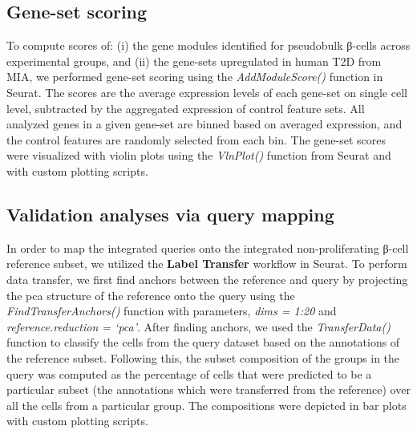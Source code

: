 \subsection{Gene-set scoring}
To compute scores of: (i) the gene modules identified for pseudobulk β-cells across experimental groups, and (ii) the gene-sets upregulated in human T2D from MIA, we performed gene-set scoring using the \textit{AddModuleScore()} function in Seurat. The scores are the average expression levels of each gene-set on single cell level, subtracted by the aggregated expression of control feature sets. All analyzed genes in a given gene-set are binned based on averaged expression, and the control features are randomly selected from each bin. The gene-set scores were visualized with violin plots using the \textit{VlnPlot()} function from Seurat and with custom plotting scripts.


\subsection{Validation analyses via query mapping}
In order to map the integrated queries onto the integrated non-proliferating β-cell reference subset, we utilized the \textbf{Label Transfer} workflow in Seurat. To perform data transfer, we first find anchors between the reference and query by projecting the \gls{pca} structure of the reference onto the query using the \textit{FindTransferAnchors()} function with parameters, \textit{dims = 1:20} and \textit{reference.reduction = `pca'}. After finding anchors, we used the \textit{TransferData()} function to classify the cells from the query dataset based on the annotations of the reference subset. Following this, the subset composition of the groups in the query was computed as the percentage of cells that were predicted to be a particular subset (the annotations which were transferred from the reference) over all the cells from a particular group. The compositions were depicted in bar plots with custom plotting scripts.